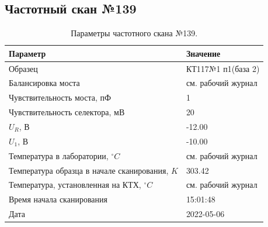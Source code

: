 \subsection{Частотный скан №139}
\begin{table}[!ht]
    \centering
    \caption{Параметры частотного скана №139.}
    \begin{tabular}{|l|l|}
        \hline
        Параметр                                       & Значение                  \\ \hline
        Образец                                        & КТ117№1 п1(база 2)        \\ \hline
        Балансировка моста                             & см. рабочий журнал        \\ \hline
        Чувствительность моста, пФ                     & 1                         \\ \hline
        Чувствительность селектора, мВ                 & 20                        \\ \hline
        $U_R$, В                                       & -12.00                    \\ \hline
        $U_1$, В                                       & -10.00                    \\ \hline
        Температура в лаборатории, $^\circ C$          & см. рабочий журнал        \\ \hline
        Температура образца в начале сканирования, $K$ & 303.42                    \\ \hline
        Температура, установленная на КТХ, $^\circ C$  & см. рабочий журнал        \\ \hline
        Время начала сканирования                      & 15:01:48                  \\ \hline
        Дата                                           & 2022-05-06                \\ \hline
    \end{tabular}
    \label{table:frequency_scan_139}
\end{table}

